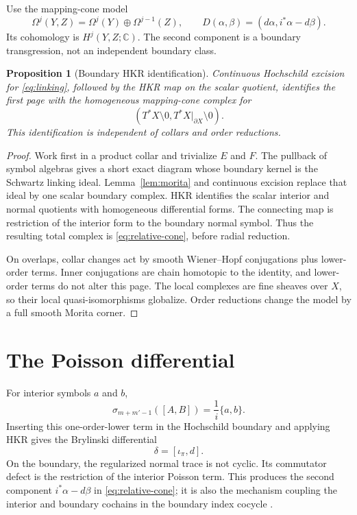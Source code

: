 \documentclass[11pt,oneside,reqno]{article}
\newcommand{\C}{\mathbb C}
\theoremstyle{plain}
\newtheorem{proposition}[theorem]{Proposition}
\theoremstyle{definition}
\theoremstyle{remark}
\begin{document}
Use the mapping-cone model
\begin{equation}\label{eq:relative-cone}
 \Omega^j(Y,Z)=\Omega^j(Y)\oplus\Omega^{j-1}(Z),
 \qquad
 D(\alpha,\beta)=(d\alpha,i^*\alpha-d\beta).
\end{equation}
Its cohomology is \(H^j(Y,Z;\C)\). The second component is a boundary
transgression, not an independent boundary class.

\begin{proposition}[Boundary HKR identification]\label{prop:HKR}
Continuous Hochschild excision for \eqref{eq:linking}, followed by the HKR
map on the scalar quotient, identifies the first page with the homogeneous
mapping-cone complex for
\[
 (T^*X\setminus0,T^*X|_{\partial X}\setminus0).
\]
This identification is independent of collars and order reductions.
\end{proposition}

\begin{proof}
Work first in a product collar and trivialize \(E\) and \(F\). The pullback
of symbol algebras gives a short exact diagram whose boundary kernel is the
Schwartz linking ideal. Lemma~\ref{lem:morita} and continuous excision replace
that ideal by one scalar boundary complex. HKR identifies the scalar
interior and normal quotients with homogeneous differential forms. The
connecting map is restriction of the interior form to the boundary normal
symbol. Thus the resulting total complex is \eqref{eq:relative-cone}, before
radial reduction.

On overlaps, collar changes act by smooth Wiener--Hopf conjugations plus
lower-order terms. Inner conjugations are chain homotopic to the identity,
and lower-order terms do not alter this page. The local complexes are fine
sheaves over \(X\), so their local quasi-isomorphisms globalize. Order
reductions change the model by a full smooth Morita corner.
\end{proof}

\section{The Poisson differential}

For interior symbols \(a\) and \(b\),
\[
 \sigma_{m+m'-1}([A,B])=\frac1i\{a,b\}.
\]
Inserting this one-order-lower term in the Hochschild boundary and applying
HKR gives the Brylinski differential
\[
 \delta=[\iota_\pi,d].
\]
On the boundary, the regularized normal trace is not cyclic. Its commutator
defect is the restriction of the interior Poisson term. This produces the
second component \(i^*\alpha-d\beta\) in \eqref{eq:relative-cone}; it is also
the mechanism coupling the interior and boundary cochains in the boundary
index cocycle \cite{FGLS,BoltachevSavin}.
\end{document}
